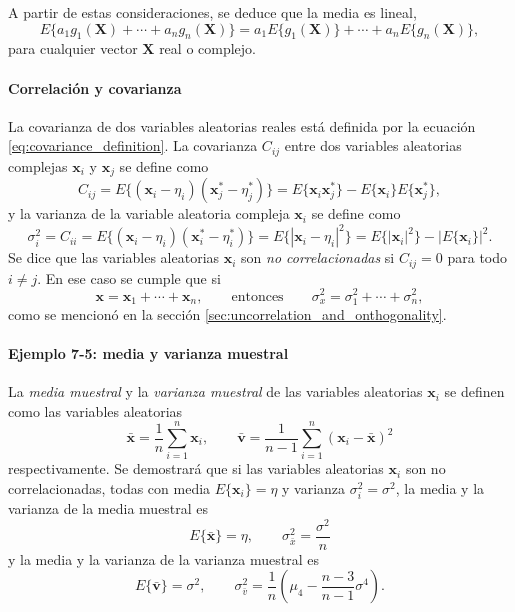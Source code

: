 \documentclass[a4paper]{report}
\newcommand{\X}{\mathbf{X}}
\newcommand{\x}{\mathbf{x}}
\begin{document}
A partir de estas consideraciones, se deduce que la media es lineal, 
\[
 E\{a_1g_1(\X)+\cdots+a_ng_n(\X)\}=a_1E\{g_1(\X)\}+\cdots+a_nE\{g_n(\X)\},
\]
para cualquier vector \(\X\) real o complejo.

\paragraph{Correlación y covarianza}

La covarianza de dos variables aleatorias reales está definida por la ecuación \ref{eq:covariance_definition}. La covarianza \(C_{ij}\) entre dos variables aleatorias complejas \(\x_i\) y \(\x_j\) se define como
\[
 C_{ij}=E\{(\x_i-\eta_i)(\x^*_j-\eta^*_j)\}=E\{\x_i\x^*_j\}-E\{\x_i\}E\{\x^*_j\},
\]
y la varianza de la variable aleatoria compleja \(\x_i\) se define como
\[
 \sigma_i^2=C_{ii}=E\{(\x_i-\eta_i)(\x^*_i-\eta^*_i)\}=E\{|\x_i-\eta_i|^2\}=E\{|\x_i|^2\}-|E\{\x_i\}|^2.
\]
Se dice que las variables aleatorias \(\x_i\) son \emph{no correlacionadas} si \(C_{ij}=0\) para todo \(i\neq j\). En ese caso se cumple que si
\begin{equation}\label{eq:variance_sum_of_uncorrelated_rv}
 \x=\x_1+\cdots+\x_n,\qquad\textrm{entonces}\qquad\sigma_x^2=\sigma_1^2+\cdots+\sigma_n^2,
\end{equation}
como se mencionó en la sección \ref{sec:uncorrelation_and_onthogonality}.

\paragraph{Ejemplo 7-5: media y varianza muestral}

La \emph{media muestral} y la \emph{varianza muestral} de las variables aleatorias \(\x_i\) se definen como las variables aleatorias
\begin{equation}\label{eq:sample_mean_and_variance}
 \bar{\x}=\frac{1}{n}\sum_{i=1}^{n}\x_i, \qquad \bar{\mathbf{v}}=\frac{1}{n-1}\sum_{i=1}^{n}(\x_i-\bar{\x})^2
\end{equation}
respectivamente. Se demostrará que si las variables aleatorias \(\x_i\) son no correlacionadas, todas con media \(E\{\x_i\}=\eta\) y varianza \(\sigma_i^2=\sigma^2\), la media y la varianza de la media muestral es
\[
 E\{\bar{\x}\}=\eta,\qquad \sigma_{\bar{x}}^2=\frac{\sigma^2}{n}
\]
y la media y la varianza de la varianza muestral es
\[
 E\{\bar{\mathbf{v}}\}=\sigma^2,\qquad \sigma^2_{\bar{v}}=\frac{1}{n}\left(\mu_4-\frac{n-3}{n-1}\sigma^4\right).
\]
\end{document}
